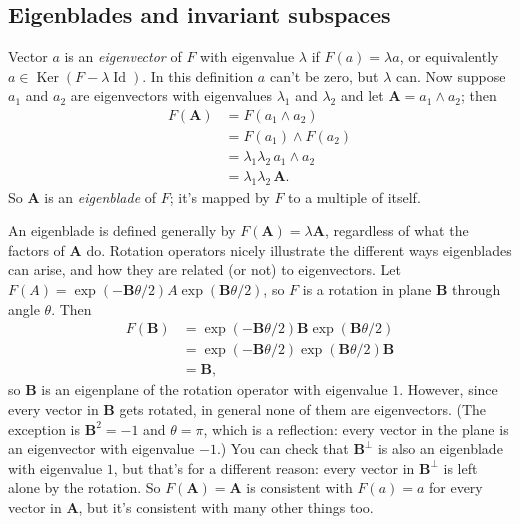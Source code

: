 \documentclass{utarticle}
\newcommand{\bl}[1]{\ensuremath{\bm{#1}}}
\newcommand{\Id}{\operatorname{Id}}
\DeclareMathOperator{\out}{\wedge}
\newcommand{\dual}[1]{\ensuremath{#1^\perp}}
\newcommand{\Ker}{\operatorname{Ker}}
\begin{document}
\subsection{Eigenblades and invariant subspaces}
\label{eigen}

Vector $a$ is an \emph{eigenvector} of $F$ with eigenvalue $\lambda$ if $F(a) = \lambda a$,
or equivalently $a \in \Ker(F - \lambda\Id)$.  In this definition $a$ can't be zero, but $\lambda$ can.
Now suppose $a_1$ and $a_2$ are eigenvectors with eigenvalues $\lambda_1$ and $\lambda_2$
and let $\bl{A} = a_1 \out a_2$; then
\begin{align}
F(\bl{A}) & = F(a_1 \out a_2) \nonumber \\ 
                & = F(a_1) \out F(a_2) \nonumber \\
                & = \lambda_1 \lambda_2 \, a_1 \out a_2 \nonumber \\
                & =  \lambda_1 \lambda_2 \, \bl{A}.
\end{align}
So \bl{A} is an \emph{eigenblade} of $F$; it's mapped by $F$ to a multiple of itself.  

 An eigenblade is defined generally by $F(\bl{A}) = \lambda \bl{A}$, regardless of what the 
factors of \bl{A} do.  Rotation operators nicely illustrate the different ways eigenblades can 
arise, and how they are related (or not) to eigenvectors.  Let $F(A) = \exp(-\bl{B} \theta/2) A 
\exp(\bl{B} \theta/2)$, so $F$ is a rotation in plane \bl{B} through angle $\theta$.  Then
\begin{align}
F(\bl{B}) & = \exp(-\bl{B} \theta/2) \bl{B} \exp(\bl{B} \theta/2) \nonumber \\
                & = \exp(-\bl{B} \theta/2) \exp(\bl{B} \theta/2) \bl{B} \nonumber \\
                & = \bl{B},
\end{align}
so \bl{B} is an eigenplane of the rotation operator with eigenvalue $1$.  However, 
since every vector in \bl{B} gets rotated, in general none of them are eigenvectors.  (The 
exception is $\bl{B}^2 = -1$ and $\theta = \pi$, which is a reflection: every vector in the plane is an 
eigenvector with eigenvalue $-1$.)  You can check that \dual{\bl{B}} is also an eigenblade with 
eigenvalue $1$, but that's for a different reason: every vector in \dual{\bl{B}} is left alone by the 
rotation.  So $F(\bl{A}) = \bl{A}$ is consistent with $F(a) = a$ for every vector in \bl{A}, but it's 
consistent with many other things too. 
\end{document}

